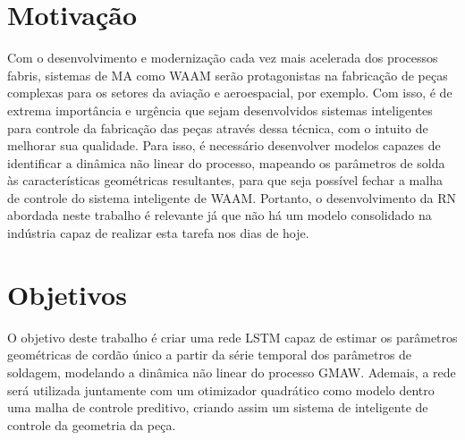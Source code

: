 \section{Motivação}
Com o desenvolvimento e modernização cada vez mais acelerada dos processos fabris, sistemas de MA como WAAM serão protagonistas na fabricação de peças complexas para os setores da aviação e aeroespacial, por exemplo. Com isso, é de extrema importância e urgência que sejam desenvolvidos sistemas inteligentes para controle da fabricação das peças através dessa técnica, com o intuito de melhorar sua qualidade. Para isso, é necessário desenvolver modelos capazes de identificar a dinâmica não linear do processo, mapeando os parâmetros de solda às características geométricas resultantes, para que seja possível fechar a malha de controle do sistema inteligente de WAAM. Portanto, o desenvolvimento da RN abordada neste trabalho é relevante já que não há um modelo consolidado na indústria capaz de realizar esta tarefa nos dias de hoje.

\section{Objetivos}
O objetivo deste trabalho é criar uma rede LSTM capaz de estimar os parâmetros geométricas de cordão único a partir da série temporal dos parâmetros de soldagem, modelando a dinâmica não linear do processo GMAW. Ademais, a rede será utilizada juntamente com um otimizador quadrático como modelo dentro uma malha de controle preditivo, criando assim um sistema de inteligente de controle da geometria da peça.